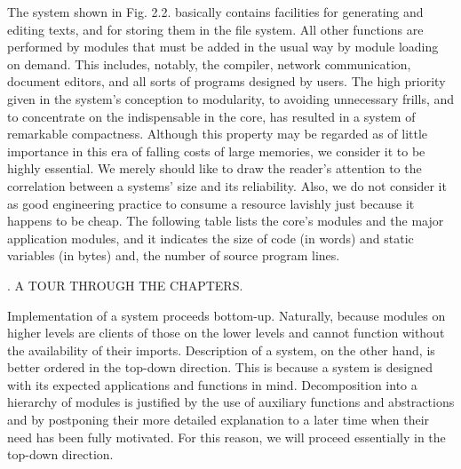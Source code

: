 The system shown in Fig. 2.2. basically contains facilities for
generating and editing texts, and for storing them in the file
system. All other functions are performed by modules that must be
added in the usual way by module loading on demand. This includes,
notably, the compiler, network communication, document editors, and
all sorts of programs designed by users. The high priority given in
the system's conception to modularity, to avoiding unnecessary frills,
and to concentrate on the indispensable in the core, has resulted in a
system of remarkable compactness. Although this property may be
regarded as of little importance in this era of falling costs of large
memories, we consider it to be highly essential. We merely should like
to draw the reader's attention to the correlation between a systems'
size and its reliability. Also, we do not consider it as good
engineering practice to consume a resource lavishly just because it
happens to be cheap. The following table lists the core's modules and
the major application modules, and it indicates the size of code (in
words) and static variables (in bytes) and, the number of source
program lines.
\medskip
{}

. A TOUR THROUGH THE CHAPTERS.

Implementation of a system proceeds bottom-up. Naturally, because
modules on higher levels are clients of those on the lower levels and
cannot function without the availability of their imports. Description
of a system, on the other hand, is better ordered in the top-down
direction. This is because a system is designed with its expected
applications and functions in mind. Decomposition into a hierarchy of
modules is justified by the use of auxiliary functions and
abstractions and by postponing their more detailed explanation to a
later time when their need has been fully motivated. For this reason,
we will proceed essentially in the top-down direction.

